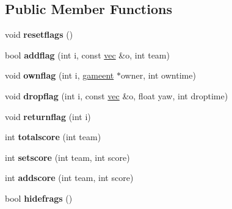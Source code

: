 \subsection*{Public Member Functions}
\begin{DoxyCompactItemize}
\item 
\mbox{\label{structctfclientmode_a6c1da9bcb03d4032a5ead9c9cc86327c}} 
void {\bfseries resetflags} ()
\item 
\mbox{\label{structctfclientmode_ad930aea037d680a90daef807b66a9e7b}} 
bool {\bfseries addflag} (int i, const \hyperlink{structvec}{vec} \&o, int team)
\item 
\mbox{\label{structctfclientmode_a478c11f516cb0c9dded743377c67f0cf}} 
void {\bfseries ownflag} (int i, \hyperlink{structgameent}{gameent} $\ast$owner, int owntime)
\item 
\mbox{\label{structctfclientmode_a1392e2e23e313f77970d8947d4dca259}} 
void {\bfseries dropflag} (int i, const \hyperlink{structvec}{vec} \&o, float yaw, int droptime)
\item 
\mbox{\label{structctfclientmode_ad63bc73f7c2cf77a626acefbb660fc1e}} 
void {\bfseries returnflag} (int i)
\item 
\mbox{\label{structctfclientmode_a45c00c645e223f67757d554ee0da56a9}} 
int {\bfseries totalscore} (int team)
\item 
\mbox{\label{structctfclientmode_aa0beab2bb8c0d6021cf60ac587c075d9}} 
int {\bfseries setscore} (int team, int score)
\item 
\mbox{\label{structctfclientmode_af14fab21e36c62e482aff35a3c105080}} 
int {\bfseries addscore} (int team, int score)
\item 
\mbox{\label{structctfclientmode_a7fc921a21fc97326fea0d0fa212f6bfa}} 
bool {\bfseries hidefrags} ()
\item 
\mbox{\label{structctfclientmode_a6f71b234634a9e85dfe2ba483cfa6660}} 

\end{DoxyCompactItemize}

